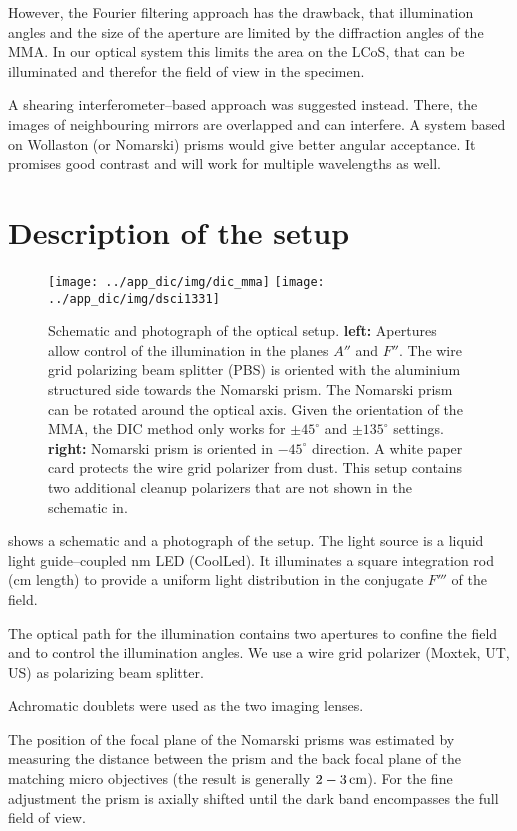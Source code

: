 However, the Fourier filtering approach has the drawback, that
illumination angles and the size of the aperture are limited by the
diffraction angles of the MMA. In our optical system this limits the
area on the LCoS, that can be illuminated and therefor the field of
view in the specimen. 

A shearing interferometer--based approach was suggested instead. There,
the images of neighbouring mirrors are overlapped and can interfere. A
system based on Wollaston (or Nomarski) prisms would give better
angular acceptance. It promises good contrast and will work for
multiple wavelengths as well.
\section{Description of the setup}
\begin{figure}[ht]
  \centering
  \texttt{[image: ../app\_dic/img/dic\_mma]}
  \texttt{[image: ../app\_dic/img/dsci1331]}
  \caption{ Schematic and photograph of the optical setup.  {\bf
      left:} Apertures allow control of the illumination in the planes
    $A''$ and $F''$. The wire grid polarizing beam splitter (PBS) is
    oriented with the aluminium structured side towards the Nomarski
    prism. The Nomarski prism can be rotated around the optical
    axis. Given the orientation of the MMA, the DIC method only works
    for $\pm 45^\circ$ and $\pm 135^\circ$ settings.  {\bf right:}
    Nomarski prism is oriented in $-45^\circ$ direction.  A white
    paper card protects the wire grid polarizer from dust.  This setup
    contains two additional cleanup polarizers that are not shown in
    the schematic in.}
  \label{fig:dic_mma}
\end{figure}
 shows a schematic and a photograph of the setup.
The light source is a liquid light guide--coupled \unit[480]{nm} LED
(CoolLed). It illuminates a square integration rod (\unit[10]{cm}
length) to provide a uniform light distribution in the conjugate
$F'''$ of the field. 

The optical path for the illumination contains two apertures to
confine the field and to control the illumination angles. We use a
wire grid polarizer (Moxtek, UT, US) as polarizing beam splitter.

Achromatic doublets were used as the two imaging lenses.

The position of the focal plane of the Nomarski prisms was estimated
by measuring the distance between the prism and the back focal plane
of the matching micro objectives (the result is generally
$\unit[2-3]{cm}$). For the fine adjustment the prism is axially
shifted until the dark band encompasses the full field of view.

